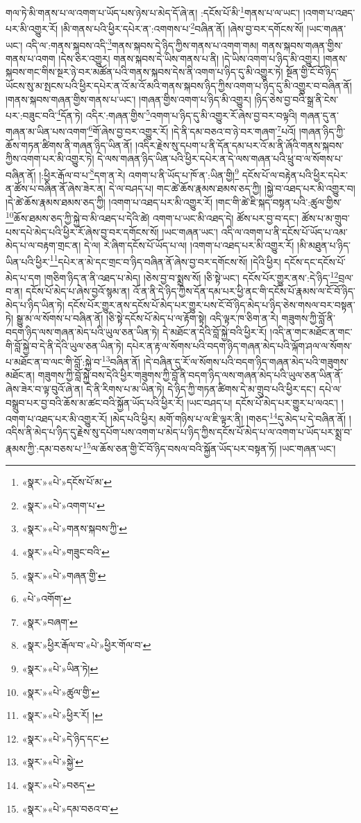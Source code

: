 གལ་ཏེ་མི་གནས་པ་ལ་འགག་པ་ཡོད་པས་ཉེས་པ་མེད་དོ་ཞེ་ན། :དངོས་པོ་མི་\footnote{«སྣར་»«པེ་»དངོས་པོ་མ་}གནས་པ་ལ་ཡང་། །འགག་པ་འཐད་པར་མི་འགྱུར་རོ། །མི་གནས་པའི་ཕྱིར་དཔེར་ན་:འགགས་པ་\footnote{«སྣར་»«པེ་»འགག་པ་}བཞིན་ནོ། །ཞེས་བྱ་བར་དགོངས་སོ། །ཡང་གཞན་ཡང་། འདི་ལ་:གནས་སྐབས་འདི་\footnote{«སྣར་»«པེ་»གནས་སྐབས་ཀྱི་}གནས་སྐབས་དེ་ཉིད་ཀྱིས་གནས་པ་འགག་གམ། གནས་སྐབས་གཞན་གྱིས་གནས་པ་འགག །དེས་ཅིར་འགྱུར། གནས་སྐབས་དེ་ཡིས་གནས་པ་ནི། །དེ་ཡིས་འགག་པ་ཉིད་མི་འགྱུར། །གནས་སྐབས་གང་གིས་སྔར་ཉེ་བར་མཚོན་པའི་གནས་སྐབས་དེས་ནི་འགག་པ་ཉིད་དུ་མི་འགྱུར་ཏེ། སྔོན་གྱི་ངོ་བོ་ཉིད་ཡོངས་སུ་མ་སྤངས་པའི་ཕྱིར་དཔེར་ན་འོ་མ་འོ་མའི་གནས་སྐབས་ཉིད་ཀྱིས་འགག་པ་ཉིད་དུ་མི་འགྱུར་བ་བཞིན་ནོ། །གནས་སྐབས་གཞན་གྱིས་གནས་པ་ཡང་། །གཞན་གྱིས་འགག་པ་ཉིད་མི་འགྱུར། །ཉིད་ཅེས་བྱ་བའི་སྒྲ་ནི་ངེས་པར་:བཟུང་བའི་\footnote{«སྣར་»«པེ་»གཟུང་བའི་}དོན་ཏེ། འདིར་:གཞན་གྱིས་\footnote{«སྣར་»«པེ་»གཞན་གྱི་}འགག་པ་ཉིད་དུ་མི་འགྱུར་རོ་ཞེས་བྱ་བར་བལྟའི། གཞན་དུ་ན་གཞན་མ་ཡིན་པས་འགག་\footnote{«པེ་»འགོག་}གོ་ཞེས་བྱ་བར་འགྱུར་རོ། །དེ་ནི་དམ་བཅའ་བ་ཉེ་བར་གཞག་\footnote{«སྣར་»བཞག་}པའོ། །གཞན་ཉིད་ཀྱི་ཆོས་གཏན་ཚིགས་ནི་གཞན་ཉིད་ཡིན་ནོ། །འདིར་རྗེས་སུ་དཔག་པ་ནི་དོན་དམ་པར་འོ་མ་ནི་ཞོའི་གནས་སྐབས་ཀྱིས་འགག་པར་མི་འགྱུར་ཏེ། དེ་ལས་གཞན་ཉིད་ཡིན་པའི་ཕྱིར་དཔེར་ན་དེ་ལས་གཞན་པའི་ཕྲུ་བ་ལ་སོགས་པ་བཞིན་ནོ། །:ཕྱིར་རྒོལ་བ་པ་\footnote{«སྣར་»ཕྱིར་རྒོལ་བ་«པེ་»ཕྱིར་གོལ་བ་}དག་ན་རེ། འགག་པ་ནི་ཡོད་པ་ཁོ་ན་:ཡིན་གྱི།\footnote{«སྣར་»«པེ་»ཡིན་ཏེ།} དངོས་པོ་ལ་བརྟེན་པའི་ཕྱིར་དཔེར་ན་ཚོས་པ་བཞིན་ནོ་ཞེས་ཟེར་ན། དེ་ལ་བཤད་པ། གང་ཚེ་ཆོས་རྣམས་ཐམས་ཅད་ཀྱི། །སྐྱེ་བ་འཐད་པར་མི་འགྱུར་བ། །དེ་ཚེ་ཆོས་རྣམས་ཐམས་ཅད་ཀྱི། །འགག་པ་འཐད་པར་མི་འགྱུར་རོ། །གང་གི་ཚེ་ཇི་སྐད་བསྟན་པའི་:ཚུལ་གྱིས་\footnote{«སྣར་»«པེ་»ཚུལ་གྱི་}ཆོས་ཐམས་ཅད་ཀྱི་སྐྱེ་བ་མི་འཐད་པ་དེའི་ཚེ། འགག་པ་ཡང་མི་འཐད་དེ། ཚོས་པར་བྱ་བ་དང་། ཚོས་པ་མ་གྲུབ་པས་དཔེ་མེད་པའི་ཕྱིར་རོ་ཞེས་བྱ་བར་དགོངས་སོ། །ཡང་གཞན་ཡང་། འདི་ལ་འགག་པ་ནི་དངོས་པོ་ཡོད་པ་འམ་མེད་པ་ལ་བརྟག་གྲང་ན། དེ་ལ། རེ་ཞིག་དངོས་པོ་ཡོད་པ་ལ། །འགག་པ་འཐད་པར་མི་འགྱུར་རོ། །མི་མཐུན་པ་ཉིད་ཡིན་པའི་ཕྱིར་\footnote{«སྣར་»«པེ་»ཕྱིར་རོ། །}དཔེར་ན་མེ་དང་གྲང་བ་ཉིད་བཞིན་ནོ་ཞེས་བྱ་བར་དགོངས་སོ། །དེའི་ཕྱིར། དངོས་དང་དངོས་པོ་མེད་པ་དག །གཅིག་ཉིད་ན་ནི་འཐད་པ་མེད། །ཅེས་བྱ་བ་སྨྲས་སོ། །ཅི་སྟེ་ཡང་། དངོས་པོར་གྱུར་ནས་:དེ་ཉིད་\footnote{«སྣར་»«པེ་»དེ་ཉིད་དང་}བྲལ་བ་ན། དངོས་པོ་མེད་པ་ཞེས་བྱའོ་སྙམ་ན། འོ་ན་ནི་དེ་ཉིད་ཀྱིས་དོན་དམ་པར་ཕྱི་ནང་གི་དངོས་པོ་རྣམས་ལ་ངོ་བོ་ཉིད་མེད་པ་ཉིད་ཡིན་ཏེ། དངོས་པོར་གྱུར་ནས་དངོས་པོ་མེད་པར་གྱུར་པས་ངོ་བོ་ཉིད་མེད་པ་ཉིད་ཅེས་གསལ་བར་བསྟན་ཏེ། སྒྱུ་མ་ལ་སོགས་པ་བཞིན་ནོ། །ཅི་སྟེ་དངོས་པོ་མེད་པ་ལ་རྟོག་སྟེ། འདི་ལྟར་ཁ་ཅིག་ན་རེ། གཟུགས་ཀྱི་བློ་ནི་བདག་ཉིད་ལས་གཞན་མེད་པའི་ཡུལ་ཅན་ཡིན་ཏེ། དེ་མཐོང་ན་དེའི་བློ་སྐྱེ་བའི་ཕྱིར་རོ། །འདི་ན་གང་མཐོང་ན་གང་གི་བློ་སྐྱེ་བ་དེ་ནི་དེའི་ཡུལ་ཅན་ཡིན་ཏེ། དཔེར་ན་རྟ་ལ་སོགས་པའི་བདག་ཉིད་གཞན་མེད་པའི་ལྐོག་ཤལ་ལ་སོགས་པ་མཐོང་ན་བ་ལང་གི་བློ་:སྐྱེ་བ་\footnote{«སྣར་»«པེ་»སྐྱེ་}བཞིན་ནོ། །དེ་བཞིན་དུ་རོ་ལ་སོགས་པའི་བདག་ཉིད་གཞན་མེད་པའི་གཟུགས་མཐོང་ན། གཟུགས་ཀྱི་བློ་སྐྱེ་བས་དེའི་ཕྱིར་གཟུགས་ཀྱི་བློ་ནི་བདག་ཉིད་ལས་གཞན་མེད་པའི་ཡུལ་ཅན་ཡིན་ནོ་ཞེས་ཟེར་བ་ལྟ་བུའོ་ཞེ་ན། དེ་ནི་རིགས་པ་མ་ཡིན་ཏེ། དེ་ཉིད་ཀྱི་གཏན་ཚིགས་དེ་མ་གྲུབ་པའི་ཕྱིར་དང་། དཔེ་ལ་བསྒྲུབ་པར་བྱ་བའི་ཆོས་མ་ཚང་བའི་སྐྱོན་ཡོད་པའི་ཕྱིར་རོ། །ཡང་བཤད་པ། དངོས་པོ་མེད་པར་གྱུར་པ་ལའང་། །འགག་པ་འཐད་པར་མི་འགྱུར་རོ། །མེད་པའི་ཕྱིར། མགོ་གཉིས་པ་ལ་ཇི་ལྟར་ནི། །གཅད་\footnote{«སྣར་»«པེ་»བཅད་}དུ་མེད་པ་དེ་བཞིན་ནོ། །འདིས་ནི་མེད་པ་ཉིད་དུ་རྗེས་སུ་དཔོག་པས་འགག་པ་མེད་པ་ཉིད་ཀྱིས་དངོས་པོ་མེད་པ་ལ་འགག་པ་ཡོད་པར་སྨྲ་བ་རྣམས་ཀྱི་:དམ་བཅས་པ་\footnote{«སྣར་»«པེ་»དམ་བཅའ་བ་}ལ་ཆོས་ཅན་གྱི་ངོ་བོ་ཉིད་བསལ་བའི་སྐྱོན་ཡོད་པར་བསྟན་ཏོ། །ཡང་གཞན་ཡང་། 